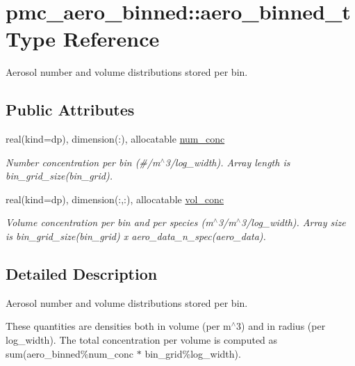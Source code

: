 \hypertarget{structpmc__aero__binned_1_1aero__binned__t}{}\section{pmc\+\_\+aero\+\_\+binned\+:\+:aero\+\_\+binned\+\_\+t Type Reference}
\label{structpmc__aero__binned_1_1aero__binned__t}


Aerosol number and volume distributions stored per bin.  


\subsection*{Public Attributes}
\begin{DoxyCompactItemize}
\item 
real(kind=dp), dimension(\+:), allocatable \mbox{\hyperlink{structpmc__aero__binned_1_1aero__binned__t_a98cd77584290aa648c1305968a0ad6c5}{num\+\_\+conc}}
\begin{DoxyCompactList}\small\item\em Number concentration per bin (\#/m$^\wedge$3/log\+\_\+width). Array length is {\ttfamily bin\+\_\+grid\+\_\+size(bin\+\_\+grid)}. \end{DoxyCompactList}\item 
real(kind=dp), dimension(\+:,\+:), allocatable \mbox{\hyperlink{structpmc__aero__binned_1_1aero__binned__t_a7953a94fa272ec829aaadf5be0a9fdc3}{vol\+\_\+conc}}
\begin{DoxyCompactList}\small\item\em Volume concentration per bin and per species (m$^\wedge$3/m$^\wedge$3/log\+\_\+width). Array size is {\ttfamily bin\+\_\+grid\+\_\+size(bin\+\_\+grid) x aero\+\_\+data\+\_\+n\+\_\+spec(aero\+\_\+data)}. \end{DoxyCompactList}\end{DoxyCompactItemize}


\subsection{Detailed Description}
Aerosol number and volume distributions stored per bin. 

These quantities are densities both in volume (per m$^\wedge$3) and in radius (per log\+\_\+width). The total concentration per volume is computed as sum(aero\+\_\+binned\%num\+\_\+conc $\ast$ bin\+\_\+grid\%log\+\_\+width).

